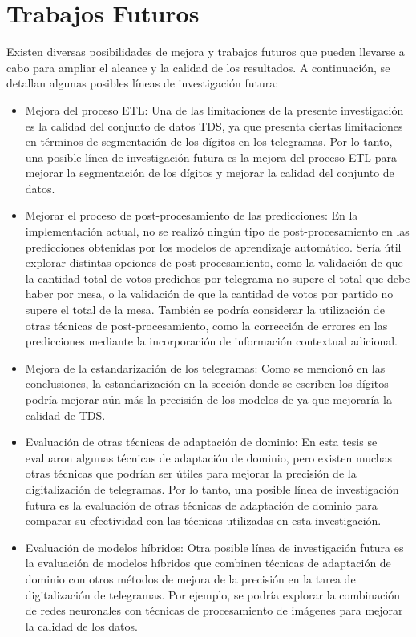 \section{Trabajos Futuros}

Existen diversas posibilidades de mejora y trabajos futuros que pueden llevarse a cabo para ampliar el alcance y la
calidad de los resultados. A continuación, se detallan algunas posibles líneas de investigación futura:

\begin{itemize}
      \item Mejora del proceso ETL: Una de las limitaciones de la presente investigación es la calidad del conjunto de datos TDS,
            ya que presenta ciertas limitaciones en términos de segmentación de los dígitos en los telegramas. Por lo tanto, una
            posible línea de investigación futura es la mejora del proceso ETL para mejorar la segmentación de los dígitos y
            mejorar la calidad del conjunto de datos.
      \item Mejorar el proceso de post-procesamiento de las predicciones: En la implementación actual, no se realizó ningún tipo de
            post-procesamiento en las predicciones obtenidas por los modelos de aprendizaje automático. Sería útil explorar
            distintas opciones de post-procesamiento, como la validación de que la cantidad total de votos predichos por telegrama
            no supere el total que debe haber por mesa, o la validación de que la cantidad de votos por partido no supere el total
            de la mesa. También se podría considerar la utilización de otras técnicas de post-procesamiento, como la corrección de
            errores en las predicciones mediante la incorporación de información contextual adicional.
      \item Mejora de la estandarización de los telegramas: Como se mencionó en las conclusiones, la estandarización en la sección
            donde se escriben los dígitos podría mejorar aún más la precisión de los modelos de ya que mejoraría la calidad de TDS.
      \item Evaluación de otras técnicas de adaptación de dominio: En esta tesis se evaluaron algunas técnicas de adaptación de
            dominio, pero existen muchas otras técnicas que podrían ser útiles para mejorar la precisión de la digitalización de
            telegramas. Por lo tanto, una posible línea de investigación futura es la evaluación de otras técnicas de adaptación de
            dominio para comparar su efectividad con las técnicas utilizadas en esta investigación.
      \item Evaluación de modelos híbridos: Otra posible línea de investigación futura es la evaluación de modelos híbridos que
            combinen técnicas de adaptación de dominio con otros métodos de mejora de la precisión en la tarea de digitalización de
            telegramas. Por ejemplo, se podría explorar la combinación de redes neuronales con técnicas de procesamiento de
            imágenes para mejorar la calidad de los datos.
\end{itemize}


